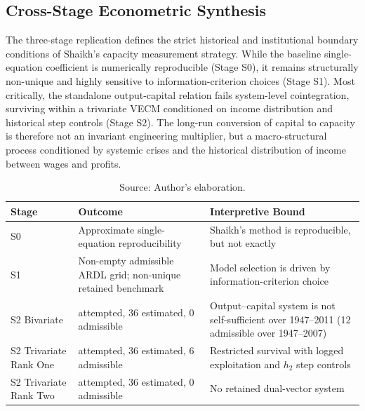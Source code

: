 \subsection{Cross-Stage Econometric Synthesis}
\label{subsec:cross_stage_synthesis_design_new}

The three-stage replication defines the strict historical and institutional boundary conditions of Shaikh’s capacity measurement strategy. While the baseline single-equation coefficient is numerically reproducible (Stage S0), it remains structurally non-unique and highly sensitive to information-criterion choices (Stage S1). Most critically, the standalone output-capital relation fails system-level cointegration, surviving within a trivariate VECM conditioned on income distribution and historical step controls (Stage S2). The long-run conversion of capital to capacity is therefore not an invariant engineering multiplier, but a macro-structural process conditioned by systemic crises and the historical distribution of income between wages and profits.

\begin{table}[H]
\centering
\caption{Cross-Stage Synthesis of the Cointegration Architecture}
\label{tab:cross_stage_synthesis}
\small
\begin{tabular}{@{}>{\raggedright\arraybackslash}p{3.2cm}>{\raggedright\arraybackslash}p{4.6cm}>{\raggedright\arraybackslash}p{5.6cm}@{}}
\toprule
Stage & Outcome & Interpretive Bound \\
\midrule
\midrule
S0 & Approximate single-equation reproducibility & Shaikh's method is reproducible, but not exactly \\
S1 & Non-empty admissible ARDL grid; non-unique retained benchmark & Model selection is driven by information-criterion choice \\
S2 Bivariate & 48 attempted, 36 estimated, 0 admissible & Output--capital system is not self-sufficient over 1947--2011 (12 admissible over 1947--2007) \\
S2 Trivariate Rank One & 48 attempted, 36 estimated, 6 admissible & Restricted survival with logged exploitation and $h_2$ step controls \\
S2 Trivariate Rank Two & 48 attempted, 36 estimated, 0 admissible & No retained dual-vector system \\
\bottomrule
\end{tabular}
\caption*{\footnotesize Source: Author's elaboration.}
\end{table}

